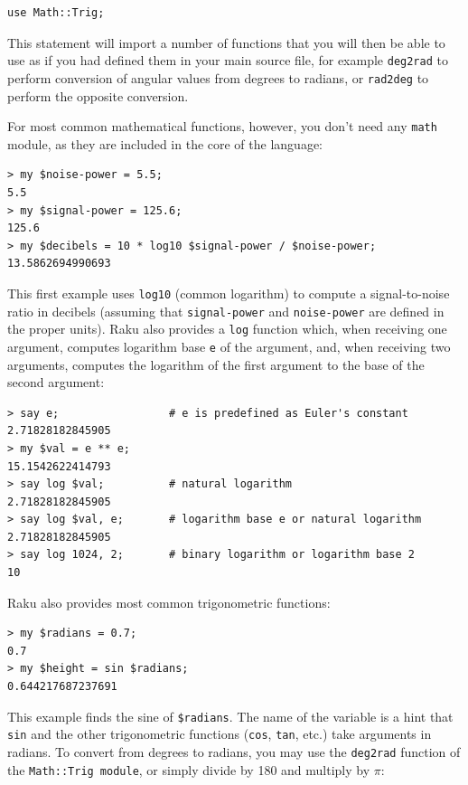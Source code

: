 \begin{verbatim}
use Math::Trig;
\end{verbatim}
%
This statement will import a number of functions that you will then be able to use as if you had defined them in your main source file, for example \verb'deg2rad' to perform conversion of angular values from degrees to radians, or \verb'rad2deg' to perform the opposite conversion.

For most common mathematical functions, however, you don't need any \verb'math' module, as they are included in the core of the language:

\begin{verbatim}
> my $noise-power = 5.5;
5.5
> my $signal-power = 125.6;
125.6
> my $decibels = 10 * log10 $signal-power / $noise-power;
13.5862694990693
\end{verbatim}
%
This first example uses \verb"log10" (common logarithm) 
to compute a signal-to-noise ratio in decibels 
(assuming that \verb"signal-power" and
\verb"noise-power" are defined in the proper units).  Raku 
also provides a {\tt log} function which, when receiving 
one argument, computes logarithm base {\tt e} of the argument, 
and, when receiving two arguments, computes the logarithm 
of the first argument to the base of the second argument:

\begin{verbatim}
> say e;                 # e is predefined as Euler's constant
2.71828182845905
> my $val = e ** e;
15.1542622414793
> say log $val;          # natural logarithm
2.71828182845905
> say log $val, e;       # logarithm base e or natural logarithm
2.71828182845905
> say log 1024, 2;       # binary logarithm or logarithm base 2
10
\end{verbatim}
%


Raku also provides most common trigonometric functions:

\begin{verbatim}
> my $radians = 0.7;
0.7
> my $height = sin $radians;
0.644217687237691
\end{verbatim}

This example finds the sine of \verb'$radians'.  The name of the
variable is a hint that {\tt sin} and the other trigonometric
functions ({\tt cos}, {\tt tan}, etc.)  take arguments 
in radians. To convert from degrees to radians, you may 
use the  \verb'deg2rad' function of the 
\verb'Math::Trig module', or simply divide by 180 
and multiply by $\pi$:

